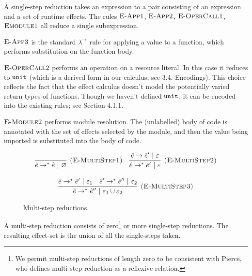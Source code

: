 \noindent
A single-step reduction takes an expression to a pair consisting of an expression and a set of runtime effects. The rules $\textsc{E-App1}$, $\textsc{E-App2}$, $\textsc{E-OperCall1}$, $\textsc{Emodule1}$ all reduce a single subexpression.

$\textsc{E-App3}$ is the standard $\lambda^{\rightarrow}$ rule for applying a value to a function, which performs substitution on the function body.

$\textsc{E-OperCall2}$ performs an operation on a resource literal. In this case it reduces to $\mathtt{unit}$ (which is a derived form in our calculus; see 3.4. Encodings). This choice reflects the fact that the effect calculus doesn't model the potentially varied return types of functions. Though we haven't defined $\mathtt{unit}$, it can be encoded into the existing rules; see Section 4.1.1.

$\textsc{E-Module2}$ performs module resolution. The (unlabelled) body of code is annotated with the set of effects selected by the module, and then the value being imported is substituted into the body of code.


\begin{figure}[h]

\noindent
{}

\[
\begin{array}{c}

\infer[\textsc{(E-MultiStep1)}]
	{\hat e \rightarrow^{*} \hat e~|~\varnothing}
	{}
~~~
\infer[\textsc{(E-MultiStep2)}]
	{\hat e \rightarrow^{*} \hat e'~|~\varepsilon}
	{\hat e \rightarrow \hat e'~|~\varepsilon} \\[3ex]
	
\infer[\textsc{(E-MultiStep3)}]
	{\hat e \rightarrow^{*} \hat e''~|~\varepsilon_1 \cup \varepsilon_2}
	{\hat e \rightarrow^{*} \hat e'~|~\varepsilon_1 & \hat e' \rightarrow^{*} \hat e''~|~\varepsilon_2}
\end{array}
\]

\vspace{-7pt}
\caption{Multi-step reductions.}
\label{This is the label.}
\end{figure}

\noindent
A multi-step reduction consists of zero\footnote{We permit multi-step reductions of length zero to be consistent with Pierce, who defines multi-step reduction as a reflexive relation\cite[p. 39]{tapl}.} or more single-step reductions. The resulting effect-set is the union of all the single-steps taken.

